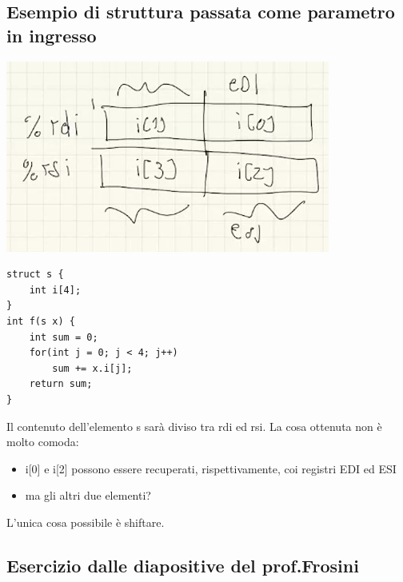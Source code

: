 \documentclass[11pt]{report}
\theoremstyle{definition}
\begin{document}
\subsection{Esempio di struttura passata come parametro in ingresso}
\begin{center}\includegraphics[scale=0.85]{img/22.PNG}\end{center}
\begin{verbatim}
struct s {
    int i[4];
}
int f(s x) {
    int sum = 0;
    for(int j = 0; j < 4; j++)
        sum += x.i[j];
    return sum;
}
\end{verbatim}
Il contenuto dell'elemento s sarà diviso tra rdi ed rsi. La cosa ottenuta non è molto comoda:
\begin{itemize}
\item i[0] e i[2] possono essere recuperati, rispettivamente, coi registri EDI ed ESI
\item ma gli altri due elementi?
\end{itemize}
L'unica cosa possibile è shiftare.


\subsection{Esercizio dalle diapositive del prof.Frosini}
\begingroup
\small
\end{document}
